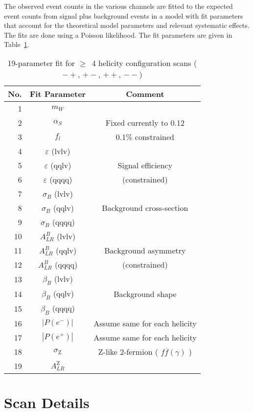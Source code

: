 \documentclass[12pt]{article}
\begin{document}
The observed event counts in the various channels are fitted 
to the expected event counts from signal plus background events in a model with fit parameters that 
account for the theoretical model parameters and relevant systematic effects.
The fits are done using a Poisson likelihood.
The fit parameters are given in Table~\ref{tab:fitparameters}.

\begin{table}[!htb]
\begin{center}
\begin{tabular}{r|c|c}
No. & Fit Parameter & Comment \\ \hline
1 &  $m_{W}$  &  \\
2 &  $\alpha_S$ &  Fixed currently to 0.12 \\ \hline
3 &  $f_l$    &  0.1\% constrained \\   \hline
4 &  $\varepsilon$ (lvlv) & \\ 
5 &  $\varepsilon$ (qqlv) & Signal efficiency \\ 
6 &  $\varepsilon$ (qqqq) &  (constrained) \\  \hline
7 &  $\sigma_B$ (lvlv) &  \\ 
8 &  $\sigma_B$ (qqlv) & Background cross-section \\ 
9 &  $\sigma_B$ (qqqq) &  \\  \hline  
10 & $A_{LR}^B $ (lvlv) & \\
11 & $A_{LR}^B $ (qqlv) & Background asymmetry \\
12 & $A_{LR}^B $ (qqqq) &  (constrained) \\    \hline
13 & $\beta_B$ (lvlv) &  \\
14 & $\beta_B$ (qqlv) &  Background shape \\ 
15 & $\beta_B$ (qqqq) &  \\  \hline
16 & $|P(e^{-})|$  &  Assume same for each helicity  \\
17 & $|P(e^{+})|$  &  Assume same for each helicity  \\
18 & $\sigma_{\mathrm{Z}}$  &  Z-like 2-fermion ( $f \overline{f} (\gamma)$ ) \\
19 & $A_{LR}^{\mathrm{Z}} $ &  \\           \hline
\end{tabular}
\caption{19-parameter fit for $\ge$~4 helicity configuration scans ($-+$, $+-$, $++$, $--$)}
\label{tab:fitparameters}
\end{center}
\end{table} 

\section*{Scan Details}
\end{document}
